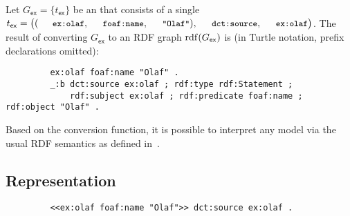 \begin{example}
	Let $G_\mathsf{ex} = \lbrace t_\mathsf{ex} \rbrace$ be an {\RDFplusGraph} that consists of a single {\RDFplusTriple} $t_\mathsf{ex} = \bigl( (\mathTinyRDF{ex:olaf},\mathTinyRDF{foaf:name},\mathTinyRDF{"Olaf"}), \mathTinyRDF{dct:source}, \mathTinyRDF{ex:olaf} \bigr)$.
	The result of converting $G_\mathsf{ex}$ to an RDF graph $\mathrm{rdf}(G_\mathsf{ex})$ is (in Turtle notation, prefix declarations omitted):
	\begin{footnotesize}%
	\begin{verbatim}
		 ex:olaf foaf:name "Olaf" .
		 _:b dct:source ex:olaf ; rdf:type rdf:Statement ;
		     rdf:subject ex:olaf ; rdf:predicate foaf:name ; rdf:object "Olaf" .
	\end{verbatim}%
	\end{footnotesize}
\end{example}

\noindent
Based on the conversion function, it is possible to interpret any {\RDFplus} model via the usual RDF semantics as defined in~\cite{Hayes04:RDFsemantics}.


\subsection{Representation}

	\begin{footnotesize}%
	\begin{verbatim}
		 <<ex:olaf foaf:name "Olaf">> dct:source ex:olaf .
	\end{verbatim}%
	\end{footnotesize}


